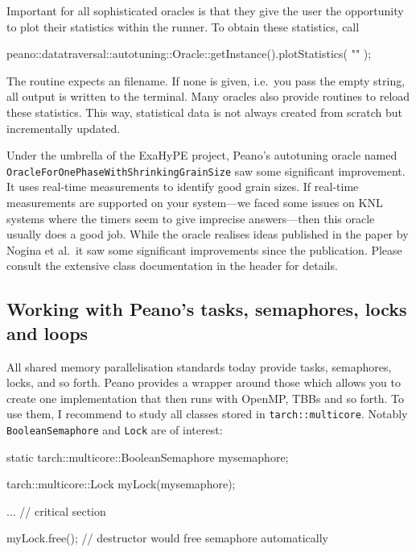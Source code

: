 Important for all sophisticated oracles is that they give the user the
opportunity to plot their statistics within the runner. 
To obtain these statistics, call
\begin{code}
  peano::datatraversal::autotuning::Oracle::getInstance().plotStatistics( "" );
\end{code}
The routine expects an filename.
If none is given, i.e.~you pass the empty string, all output is written to the
terminal.
Many oracles also provide routines to reload these statistics.
This way, statistical data is not always created from scratch but incrementally
updated.


\begin{remark}
 Under the umbrella of the ExaHyPE project, Peano's autotuning oracle named
 \texttt{OracleForOnePhaseWithShrinkingGrainSize} saw some significant
 improvement. It uses real-time measurements to identify good grain sizes. 
 If real-time measurements are supported on your system---we faced some issues
 on KNL systems where the timers seem to give imprecise answers---then this
 oracle usually does a good job. While the oracle realises ideas published in
 the paper by Nogina et al.~it saw some significant improvements since the
 publication. Please consult the extensive class documentation in the header for
 details.
\end{remark}



\subsection{Working with Peano's tasks, semaphores, locks and loops}

All shared memory parallelisation standards today provide tasks, semaphores,
locks, and so forth.
Peano provides a wrapper around those which allows you to create one
implementation that then runs with OpenMP, TBBs and so forth.
To use them, I recommend to study all classes stored in
\texttt{tarch::multicore}.
Notably \texttt{BooleanSemaphore} and \texttt{Lock} are of interest:

\begin{code}
  static tarch::multicore::BooleanSemaphore  mysemaphore;
  
  
  tarch::multicore::Lock   myLock(mysemaphore);
  
  ...            // critical section
  
  myLock.free(); // destructor would free semaphore automatically
\end{code}


